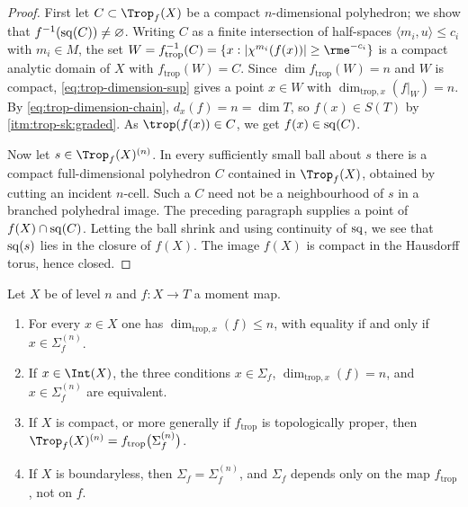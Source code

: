 \begin{proof}
First let $C\subset\Trop_f(X)$ be a compact $n$-dimensional polyhedron; we
show that $f^{-1}(\operatorname{sq}(C))\ne\varnothing$. Writing $C$ as a finite
intersection of half-spaces $\langle m_i,u\rangle\le c_i$ with
$m_i\in M$, the set
$W=f_{\mathrm{trop}}^{-1}(C)=\{x:|\chi^{m_i}(f(x))|\ge\rme^{-c_i}\}$ is a
compact analytic domain of $X$ with $f_{\mathrm{trop}}(W)=C$. Since
$\dim f_{\mathrm{trop}}(W)=n$ and $W$ is compact,
\eqref{eq:trop-dimension-sup} gives a point $x\in W$ with
$\dim_{\mathrm{trop},x}(f|_W)=n$. By \eqref{eq:trop-dimension-chain},
$d_x(f)=n=\dim T$, so $f(x)\in S(T)$ by
 \cref{itm:trop-sk:graded}. As
$\trop(f(x))\in C$, we get $f(x)\in\operatorname{sq}(C)$.

Now let $s\in\Trop_f(X)^{(n)}$. In every sufficiently small ball about $s$
there is a compact full-dimensional polyhedron $C$ contained in
$\Trop_f(X)$, obtained by cutting an incident $n$-cell. Such a $C$ need
not be a neighbourhood of $s$ in a branched polyhedral image. The preceding
paragraph supplies a point of $f(X)\cap\operatorname{sq}(C)$. Letting the ball shrink and
using continuity of $\operatorname{sq}$, we see that $\operatorname{sq}(s)$ lies in the closure of
$f(X)$. The image $f(X)$ is compact in the Hausdorff torus, hence closed.
\end{proof}

\begin{theorem}
\label{thm:trop-dimension-sigma}
Let $X$ be of level $n$ and $f:X\to T$ a moment map.
\begin{enumerate}
\item\label{itm:trop-dimsig:a} For every $x\in X$ one has
  $\dim_{\mathrm{trop},x}(f)\le n$, with equality if and only if
  $x\in\Sigma_f^{(n)}$.
\item\label{itm:trop-dimsig:b} If $x\in\Int(X)$, the three conditions
  $x\in\Sigma_f$, $\dim_{\mathrm{trop},x}(f)=n$, and
  $x\in\Sigma_f^{(n)}$ are equivalent.
\item\label{itm:trop-dimsig:c} If $X$ is compact, or more generally if
  $f_{\mathrm{trop}}$ is topologically proper, then
  $\Trop_f(X)^{(n)}=f_{\mathrm{trop}}\bigl(\Sigma_f^{(n)}\bigr)$.
\item\label{itm:trop-dimsig:d} If $X$ is boundaryless, then
  $\Sigma_f=\Sigma_f^{(n)}$, and $\Sigma_f$ depends only on the map
  $f_{\mathrm{trop}}$, not on $f$.
\end{enumerate}
\end{theorem}

